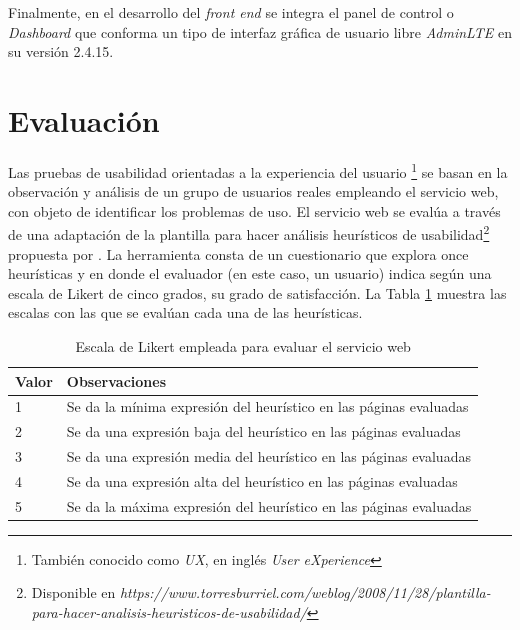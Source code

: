 Finalmente, en el desarrollo del \emph{front end} se integra el panel de control o \emph{Dashboard} que conforma un tipo de interfaz gr\'afica de usuario libre \emph{AdminLTE} en su versi\'on 2.4.15.

\section{Evaluaci\'on}

Las pruebas de usabilidad orientadas a la experiencia del usuario \footnote{Tambi\'en conocido como \emph{UX}, en ingl\'es \emph{User eXperience}} se basan en la observaci\'on y an\'alisis de un grupo de usuarios reales empleando el servicio web, con objeto de identificar los problemas de uso. El servicio web se eval\'ua a trav\'es de una adaptaci\'on de la plantilla para hacer an\'alisis heur\'isticos de usabilidad\footnote{Disponible en \emph{https://www.torresburriel.com/weblog/2008/11/28/plantilla-para-hacer-analisis-heuristicos-de-usabilidad/}} propuesta por \cite{OnceHeuristicas}. La herramienta consta de un cuestionario que explora once heur\'isticas y en donde el evaluador (en este caso, un usuario) indica seg\'un una escala de Likert de cinco grados, su grado de satisfacci\'on. La Tabla \ref{tablaEscalasLikert} muestra las escalas con las que se eval\'uan cada una de las heur\'isticas.\newline

\begin{table}[htbp]
    \begin{center}
    \caption{Escala de Likert empleada para evaluar el servicio web}
    \begin{tabular}{| p{1.5cm}| p{11cm} |}
    \hline
    \centering \textbf{Valor } & \textbf{Observaciones} \\
    \hline \hline
    1 & Se da la m\'inima expresi\'on del heur\'istico en las p\'aginas evaluadas \\ \hline
    2 & Se da una expresi\'on baja del heur\'istico en las p\'aginas evaluadas \\ \hline
    3 & Se da una expresi\'on media del heur\'istico en las p\'aginas evaluadas \\ \hline
    4 & Se da una expresi\'on alta del heur\'istico en las p\'aginas evaluadas \\ \hline
    5 & Se da la m\'axima expresi\'on del heur\'istico en las p\'aginas evaluadas \\ \hline
    \end{tabular}
    \label{tablaEscalasLikert}
    \end{center}
\end{table}


